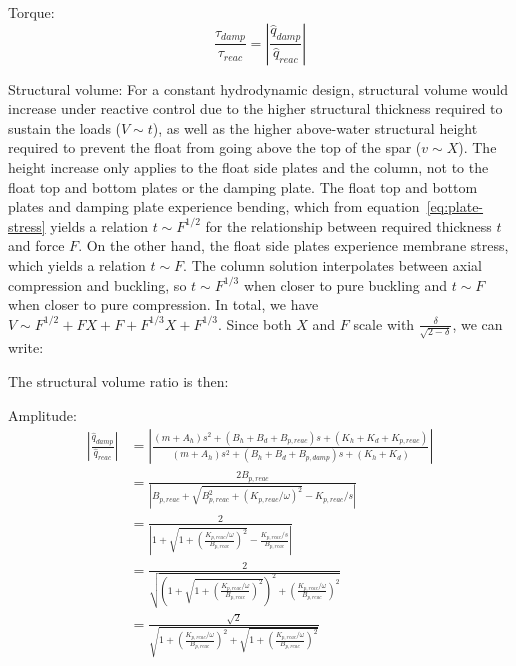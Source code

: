 Torque:
\begin{equation}
    \frac{\tau_{damp}}{\tau_{reac}} = \left|\frac{ \hat{q}_{damp}}{ \hat{q}_{reac}}\right|
\end{equation}

Structural volume:
For a constant hydrodynamic design, structural volume would increase under reactive control due to the higher structural thickness required to sustain the loads ($V\sim t$), as well as the higher above-water structural height required to prevent the float from going above the top of the spar ($v\sim X$).
The height increase only applies to the float side plates and the column, not to the float top and bottom plates or the damping plate.
The float top and bottom plates and damping plate experience bending, which from equation~\eqref{eq:plate-stress} yields a relation $t \sim F^{1/2}$ for the relationship between required thickness $t$ and force $F$.
On the other hand, the float side plates experience membrane stress, which yields a relation $t \sim F$.
The column solution interpolates between axial compression and buckling, so $t \sim F^{1/3}$ when closer to pure buckling and $t \sim F$ when closer to pure compression.
In total, we have $V \sim F^{1/2} + FX + F + F^{1/3}X + F^{1/3}$.
Since both $X$ and $F$ scale with $\frac{\delta}{\sqrt{2-\delta}}$, we can write:


The structural volume ratio is then:

Amplitude:
\begin{equation}
\begin{aligned}
    \left|\frac{ \hat{q}_{damp}}{ \hat{q}_{reac}}\right| &= \left|\frac{
        (m+A_h)s^2+(B_h+B_d+B_{p,reac})s+(K_h+K_d+K_{p,reac})} 
        { (m+A_h)s^2+(B_h+B_d+B_{p,damp})s+(K_h+K_d)}\right| \\ 
        &= \frac{2B_{p,reac}}
        {\left|B_{p,reac}+\sqrt{B_{p,reac}^2+(K_{p,reac}/\omega)^2}-K_{p,reac}/s\right|} \\ 
        & = \frac{2}{\left|1 + \sqrt{1 + \left(\frac{K_{p,reac}/\omega}{B_{p,reac}}\right) ^2  } - \frac{K_{p,reac}/s}{B_{p,reac}}\right|}  \\
        &= \frac{2}{\sqrt{ \left(1 + \sqrt{1 + \left(\frac{K_{p,reac}/\omega}{B_{p,reac}}\right) ^2  }\right)^2 + \left(\frac{K_{p,reac}/\omega}{B_{p,reac}}\right)^2 }} \\ 
        &= \frac{\sqrt{2}}{\sqrt{ 1 + \left(\frac{K_{p,reac}/\omega}{B_{p,reac}}\right)^2 + \sqrt{1 + \left(\frac{K_{p,reac}/\omega}{B_{p,reac}}\right) ^2  } }} \\
\end{aligned}
\end{equation}

